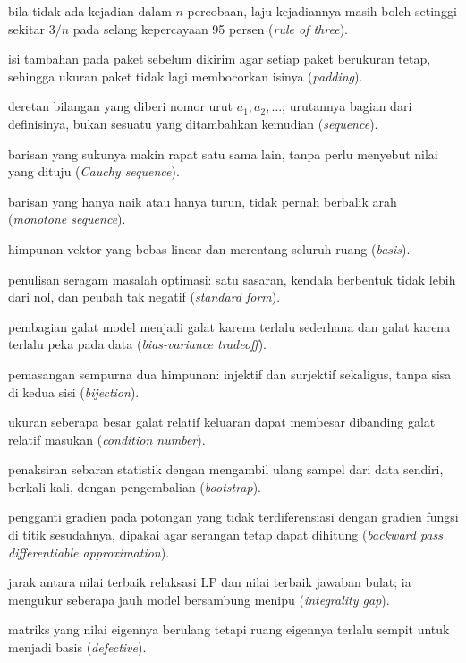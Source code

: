 \documentclass[11pt,a4paper,oneside]{book}
\theoremstyle{definition}
\theoremstyle{plain}
\theoremstyle{remark}
\begin{document}
\begin{description}[style=nextline,itemsep=0.35em]
  \item[Aturan tiga] bila tidak ada kejadian dalam $n$ percobaan, laju kejadiannya masih boleh setinggi sekitar $3/n$ pada selang kepercayaan 95 persen (\emph{rule of three}).
  \item[Bantalan] isi tambahan pada paket sebelum dikirim agar setiap paket berukuran tetap, sehingga ukuran paket tidak lagi membocorkan isinya (\emph{padding}).
  \item[Barisan] deretan bilangan yang diberi nomor urut $a_1,a_2,\dots$; urutannya bagian dari definisinya, bukan sesuatu yang ditambahkan kemudian (\emph{sequence}).
  \item[Barisan Cauchy] barisan yang sukunya makin rapat satu sama lain, tanpa perlu menyebut nilai yang dituju (\emph{Cauchy sequence}).
  \item[Barisan monoton] barisan yang hanya naik atau hanya turun, tidak pernah berbalik arah (\emph{monotone sequence}).
  \item[Basis] himpunan vektor yang bebas linear dan merentang seluruh ruang (\emph{basis}).
  \item[Bentuk baku] penulisan seragam masalah optimasi: satu sasaran, kendala berbentuk tidak lebih dari nol, dan peubah tak negatif (\emph{standard form}).
  \item[Bias-variansi] pembagian galat model menjadi galat karena terlalu sederhana dan galat karena terlalu peka pada data (\emph{bias-variance tradeoff}).
  \item[Bijeksi] pemasangan sempurna dua himpunan: injektif dan surjektif sekaligus, tanpa sisa di kedua sisi (\emph{bijection}).
  \item[Bilangan kondisi] ukuran seberapa besar galat relatif keluaran dapat membesar dibanding galat relatif masukan (\emph{condition number}).
  \item[Bootstrap] penaksiran sebaran statistik dengan mengambil ulang sampel dari data sendiri, berkali-kali, dengan pengembalian (\emph{bootstrap}).
  \item[BPDA] pengganti gradien pada potongan yang tidak terdiferensiasi dengan gradien fungsi di titik sesudahnya, dipakai agar serangan tetap dapat dihitung (\emph{backward pass differentiable approximation}).
  \item[Celah integralitas] jarak antara nilai terbaik relaksasi LP dan nilai terbaik jawaban bulat; ia mengukur seberapa jauh model bersambung menipu (\emph{integrality gap}).
  \item[Defective] matriks yang nilai eigennya berulang tetapi ruang eigennya terlalu sempit untuk menjadi basis (\emph{defective}).

\end{description}
\end{document}
